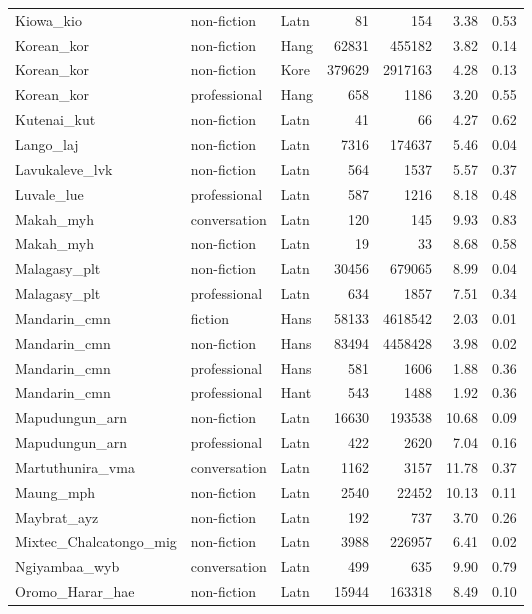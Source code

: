 \begin{longtable}{lllrrrr}
  Kiowa\_kio & non-fiction & Latn & 81 & 154 & 3.38 & 0.53 \\ 
  Korean\_kor & non-fiction & Hang & 62831 & 455182 & 3.82 & 0.14 \\ 
  Korean\_kor & non-fiction & Kore & 379629 & 2917163 & 4.28 & 0.13 \\ 
  Korean\_kor & professional & Hang & 658 & 1186 & 3.20 & 0.55 \\ 
  Kutenai\_kut & non-fiction & Latn & 41 & 66 & 4.27 & 0.62 \\ 
  Lango\_laj & non-fiction & Latn & 7316 & 174637 & 5.46 & 0.04 \\ 
  Lavukaleve\_lvk & non-fiction & Latn & 564 & 1537 & 5.57 & 0.37 \\ 
  Luvale\_lue & professional & Latn & 587 & 1216 & 8.18 & 0.48 \\ 
  Makah\_myh & conversation & Latn & 120 & 145 & 9.93 & 0.83 \\ 
  Makah\_myh & non-fiction & Latn & 19 & 33 & 8.68 & 0.58 \\ 
  Malagasy\_plt & non-fiction & Latn & 30456 & 679065 & 8.99 & 0.04 \\ 
  Malagasy\_plt & professional & Latn & 634 & 1857 & 7.51 & 0.34 \\ 
  Mandarin\_cmn & fiction & Hans & 58133 & 4618542 & 2.03 & 0.01 \\ 
  Mandarin\_cmn & non-fiction & Hans & 83494 & 4458428 & 3.98 & 0.02 \\ 
  Mandarin\_cmn & professional & Hans & 581 & 1606 & 1.88 & 0.36 \\ 
  Mandarin\_cmn & professional & Hant & 543 & 1488 & 1.92 & 0.36 \\ 
  Mapudungun\_arn & non-fiction & Latn & 16630 & 193538 & 10.68 & 0.09 \\ 
  Mapudungun\_arn & professional & Latn & 422 & 2620 & 7.04 & 0.16 \\ 
  Martuthunira\_vma & conversation & Latn & 1162 & 3157 & 11.78 & 0.37 \\ 
  Maung\_mph & non-fiction & Latn & 2540 & 22452 & 10.13 & 0.11 \\ 
  Maybrat\_ayz & non-fiction & Latn & 192 & 737 & 3.70 & 0.26 \\ 
  Mixtec\_Chalcatongo\_mig & non-fiction & Latn & 3988 & 226957 & 6.41 & 0.02 \\ 
  Ngiyambaa\_wyb & conversation & Latn & 499 & 635 & 9.90 & 0.79 \\ 
  Oromo\_Harar\_hae & non-fiction & Latn & 15944 & 163318 & 8.49 & 0.10 \\ 

\end{longtable}
